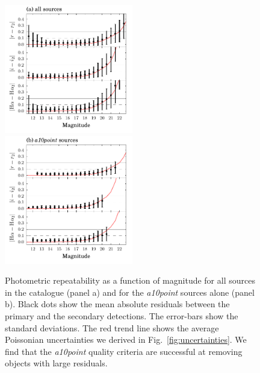 \documentclass[a4paper,useAMS,usenatbib]{mn2e}
\begin{document}
\begin{figure}
	\vspace{1cm}
    \begin{minipage}[b]{\linewidth}
        \includegraphics[width=0.5\textwidth]{figures/repeatability/repeatability.pdf} 
        \includegraphics[width=0.5\textwidth]{figures/repeatability/repeatability-a10point.pdf}
    \end{minipage}
    \caption{Photometric repeatability as a function of magnitude
         for all sources in the catalogue (panel a)
         and for the \emph{a10point} sources alone (panel b).
         Black dots show the mean absolute residuals
         between the primary and the secondary detections.
         The error-bars show the standard deviations.
         The red trend line shows the average Poissonian uncertainties
         we derived in Fig.~\ref{fig:uncertainties}.
         We find that the \emph{a10point} quality criteria are successful
         at removing objects with large residuals.}
    \label{fig:pairmag}


\end{figure}
\end{document}
